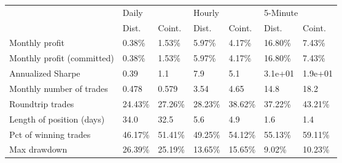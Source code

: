 \begin{tabular}{lllllll}
\toprule
{} & \multicolumn{2}{l}{Daily} & \multicolumn{2}{l}{Hourly} & \multicolumn{2}{l}{5-Minute} \\
{} &    Dist. &   Coint. &    Dist. &   Coint. &    Dist. &   Coint. \\
\midrule
Monthly profit             &   0.38\% &   1.53\% &   5.97\% &   4.17\% &  16.80\% &   7.43\% \\
Monthly profit (committed) &   0.38\% &   1.53\% &   5.97\% &   4.17\% &  16.80\% &   7.43\% \\
Annualized Sharpe          &     0.39 &      1.1 &      7.9 &      5.1 &  3.1e+01 &  1.9e+01 \\
Monthly number of trades   &    0.478 &    0.579 &     3.54 &     4.65 &     14.8 &     18.2 \\
Roundtrip trades           &  24.43\% &  27.26\% &  28.23\% &  38.62\% &  37.22\% &  43.21\% \\
Length of position (days)  &     34.0 &     32.5 &      5.6 &      4.9 &      1.6 &      1.4 \\
Pct of winning trades      &  46.17\% &  51.41\% &  49.25\% &  54.12\% &  55.13\% &  59.11\% \\
Max drawdown               &  26.39\% &  25.19\% &  13.65\% &  15.65\% &   9.02\% &  10.23\% \\
\bottomrule
\end{tabular}
